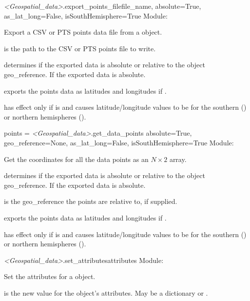 \documentclass{manual}
\begin{document}
\begin{methoddesc}{\emph{<Geospatial_data>}.export_points_file}{file_name, absolute=True,
                                       as_lat_long=False, isSouthHemisphere=True}
Module: 

Export a CSV or PTS points data file from a  object.

 is the path to the CSV or PTS points file to write.

 determines if the exported data is absolute or relative to the 
 object geo_reference.  If  the exported 
data is absolute.

 exports the points data as latitudes and longitudes if .

 has effect only if  is  and causes 
latitude/longitude values to be for the southern () or northern hemispheres
().
\end{methoddesc}

\begin{methoddesc}{points = \emph{<Geospatial_data>}.get_data_points}
        {absolute=True, geo_reference=None,
         as_lat_long=False, isSouthHemisphere=True}
Module: 

Get the coordinates for all the data points as an $N \times 2$ array.

 determines if the exported data is absolute or relative to the 
 object geo_reference.  If  the exported 
data is absolute.

 is the geo_reference the points are relative to, if supplied.

 exports the points data as latitudes and longitudes if .

 has effect only if  is  and causes 
latitude/longitude values to be for the southern () or northern hemispheres
().
\end{methoddesc}

\begin{methoddesc}{\emph{<Geospatial_data>}.set_attributes}{attributes}
Module: 

Set the attributes for a  object.

 is the new value for the object's attributes.  May be a dictionary or .
\end{methoddesc}
\end{document}
